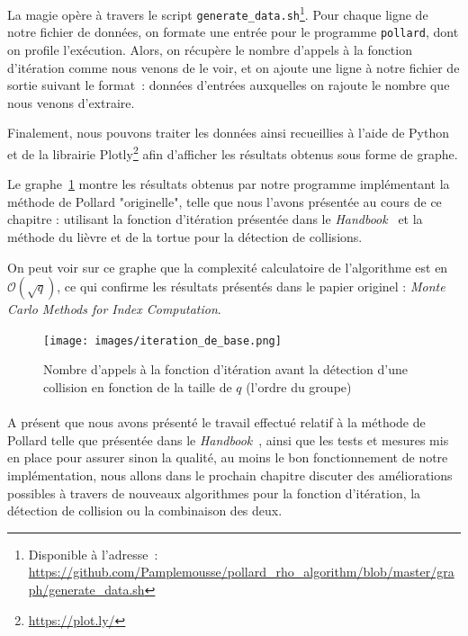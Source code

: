       La magie opère à travers le script \lstinline{generate_data.sh}\footnote{Disponible à l'adresse~: \url{https://github.com/Pamplemousse/pollard_rho_algorithm/blob/master/graph/generate_data.sh}}.
      Pour chaque ligne de notre fichier de données, on formate une entrée pour le programme \lstinline{pollard}, dont on profile l'exécution.
      Alors, on récupère le nombre d'appels à la fonction d'itération comme nous venons de le voir, et on ajoute une ligne à notre fichier de sortie suivant le format~: données d'entrées auxquelles on rajoute le nombre que nous venons d'extraire.

      Finalement, nous pouvons traiter les données ainsi recueillies à l'aide de Python et de la librairie Plotly\footnote{\url{https://plot.ly/}} afin d'afficher les résultats obtenus sous forme de graphe.

      Le graphe~\ref{fig:basic_iteration_results} montre les résultats obtenus par notre programme implémentant la méthode de Pollard "originelle", telle que nous l'avons présentée au cours de ce chapitre : utilisant la fonction d'itération présentée dans le \textit{Handbook}~\autocite[107]{handbook} et la méthode du lièvre et de la tortue pour la détection de collisions.

      On peut voir sur ce graphe que la complexité calculatoire de l'algorithme est en $\mathcal{O}(\sqrt{q})$, ce qui confirme les résultats présentés dans le papier originel : \textit{Monte Carlo Methods for Index Computation}\autocite{pollard0}.

      \begin{figure}
        \center{}
        \texttt{[image: images/iteration\_de\_base.png]}
        \caption{Nombre d'appels à la fonction d'itération avant la détection d'une collision en fonction de la taille de $q$ (l'ordre du groupe)}
        \label{fig:basic_iteration_results}
      \end{figure}


    \paragraph{}
    A présent que nous avons présenté le travail effectué relatif à la méthode de Pollard telle que présentée dans le \textit{Handbook}~\autocite[106]{handbook}, ainsi que les tests et mesures mis en place pour assurer sinon la qualité, au moins le bon fonctionnement de notre implémentation, nous allons dans le prochain chapitre discuter des améliorations possibles à travers de nouveaux algorithmes pour la fonction d'itération, la détection de collision ou la combinaison des deux.
